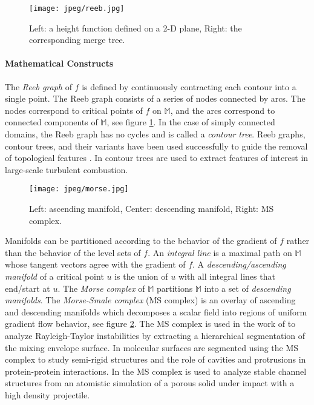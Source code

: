 \begin{figure}[ht]
  \center
  \texttt{[image: jpeg/reeb.jpg]} 
  \caption{Left: a height function defined on a 2-D plane, Right: the corresponding merge tree.}
  \label{fig:reeb}
\end{figure}


\paragraph{Mathematical Constructs}
The \emph{Reeb graph} of $f$ is defined by continuously contracting
each contour into a single point.  The Reeb graph consists of a series of nodes
connected by arcs. The nodes correspond to critical points of $f$ on
$\mathbb{M}$, and the arcs correspond to connected components of $\mathbb{M}$, see
figure \ref{fig:reeb}.
In the case of simply connected domains, the Reeb graph has no cycles and is
called a \emph{contour tree}.
Reeb graphs, contour trees, and their variants have been used successfully to guide the
removal of topological features \cite{Cignoni:Simplification, Bremer:Hierarchy, Guskov:NoiseRemoval,
 Carr:Contour, Wood:ExcessTopo}.  In \cite{Mascarenhas:Combustion} contour trees are used to
extract features of interest in large-scale turbulent combustion.

\begin{figure}[ht]
  \center
  \texttt{[image: jpeg/morse.jpg]} 
  \caption{Left: ascending manifold, Center: descending manifold, Right: MS complex.}
  \label{fig:morse}
\end{figure}

Manifolds can be partitioned according to the behavior of the gradient of $f$ 
rather than the behavior of the level sets of $f$.
An \emph{integral line} is a maximal path on $\mathbb{M}$  whose tangent 
vectors agree with the gradient of $f$.  
A \emph{descending/ascending manifold} of a critical point $u$ is the union of $u$ with 
all integral lines that end/start at $u$.  
The \emph{Morse complex} of $\mathbb{M}$ partitions $\mathbb{M}$
into a set of \emph{descending manifolds}.
The \emph{Morse-Smale complex} (MS complex) is an overlay of ascending and descending 
manifolds which decomposes a scalar field into regions of 
uniform gradient flow behavior, see figure \ref{fig:morse}.  
The MS complex is used in the work of \cite{Laney:TurbulentMixing} 
to analyze Rayleigh-Taylor instabilities by extracting a hierarchical segmentation of the mixing 
envelope surface.  In \cite{Natarajan:Molecules}  molecular surfaces are segmented using the 
MS complex to study semi-rigid structures and the role of cavities and protrusions in protein-protein interactions.
In \cite{Gyulassy:2007:TCD} the MS complex is used to analyze stable channel structures from an atomistic
simulation of a porous solid under impact with a high density projectile. 



